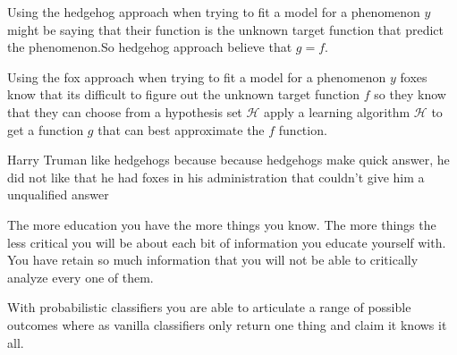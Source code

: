 \documentclass[12pt]{article}
\begin{document}


\begin{enumerate}


Using the hedgehog approach when trying to fit a model for a phenomenon $y$ might be saying that their function  is the unknown target function  that predict the phenomenon.So hedgehog approach believe that  $g = f$. 

Using the fox approach when trying to fit a model for a phenomenon $y$ foxes know that its difficult to figure out the unknown target function $f$ so they know that they can choose from a hypothesis set  $\mathcal{H}$ apply a learning algorithm $\mathcal{H}$ to get a function $g$ that can best approximate the $f$ function.


Harry Truman like hedgehogs because because hedgehogs make quick answer, he did not like that he had foxes in his administration that couldn't give him a unqualified answer 



The more education you have the more things you know. The more things the less critical you will be about each bit of information you educate yourself with. You have retain so much information that you will not be able to critically analyze every one of them. 

\newpage
{}

With probabilistic classifiers you are able to articulate a range of possible outcomes where as vanilla classifiers only return one thing and claim it knows it all. 

\end{enumerate}
\end{document}
